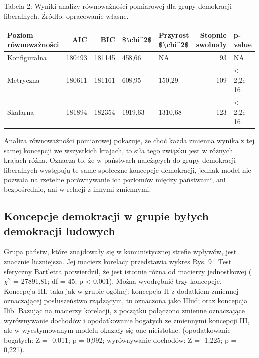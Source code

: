 \documentclass[12pt]{article}
\begin{document}
Tabela 2: Wyniki analizy równoważności pomiarowej dla grupy demokracji liberalnych. Źródło: opracowanie własne.

\begin{tabular}{l|r|r|l|l|r|l}
\hline
Poziom równoważności & AIC & BIC & \$\textbackslash{}chi\textasciicircum{}2\$ & Przyrost \$\textbackslash{}chi\textasciicircum{}2\$ & Stopnie swobody & p-value\\
\hline
Konfiguralna & 180493 & 181145 & 458,66 & NA & 93 & NA\\
\hline
Metryczna & 180611 & 181161 & 608,95 & 150,29 & 109 & < 2,2e-16\\
\hline
Skalarna & 181894 & 182354 & 1919,63 & 1310,68 & 123 & < 2.2e-16\\
\hline
\end{tabular}

Analiza równoważności pomiarowej pokazuje, że choć każda zmienna wynika z tej samej koncepcji we wszystkich krajach, to siła tego związku jest w różnych krajach różna. Oznacza to, że w państwach należących do grupy demokracji liberalnych występują te same społeczne koncepcje demokracji, jednak model nie pozwala na rzetelne porównywanie ich poziomów między państwami, ani bezpośrednio, ani w relacji z innymi zmiennymi.

\hypertarget{koncepcje-demokracji-w-grupie-byux142ych-demokracji-ludowych}{%
\subsection{Koncepcje demokracji w grupie byłych demokracji ludowych}\label{koncepcje-demokracji-w-grupie-byux142ych-demokracji-ludowych}}

Grupa państw, które znajdowały się w komunistycznej strefie wpływów, jest znacznie liczniejsza. Jej macierz korelacji przedstawia wykres Rys. 9 . Test sferyczny Bartletta potwierdził, że jest istotnie różna od macierzy jednostkowej (\(\chi^2\) = 27891,81; df = 45; p \textless{} 0,001). Można wyodrębnić trzy koncepcje. Koncepcja III, taka jak w grupie ogólnej; koncepcja II z dodatkiem zmiennej oznaczającej posłuszeństwo rządzącym, tu oznaczona jako IIlud; oraz koncepcja Ilib. Bazując na macierzy korelacji, z początku połączono zmienne oznaczające wyrównywanie dochodów i opodatkowanie bogatych ze zmiennymi koncepcji III, ale w wyestymowanym modelu okazały się one nieistotne. (opodatkowanie bogatych: Z = -0,011; p = 0,992; wyrównywanie dochodów: Z = -1,225; p = 0,221).
\end{document}
